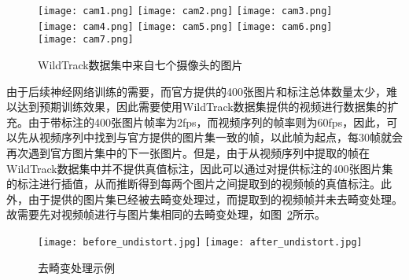 \begin{figure}
    \centering
    \subcaptionbox{\label{cam1}}
      {\texttt{[image: cam1.png]}}
    \subcaptionbox{\label{cam2}}
      {\texttt{[image: cam2.png]}}
    \subcaptionbox{\label{cam3}}
      {\texttt{[image: cam3.png]}}
    \quad
    \subcaptionbox{\label{cam4}}
      {\texttt{[image: cam4.png]}}
    \subcaptionbox{\label{cam5}}
      {\texttt{[image: cam5.png]}}
    \subcaptionbox{\label{cam6}}
      {\texttt{[image: cam6.png]}}
    \subcaptionbox{\label{cam7}}
      {\texttt{[image: cam7.png]}}
    \caption{WildTrack数据集中来自七个摄像头的图片}
    \label{WildTrack_Cam}
\end{figure}

由于后续神经网络训练的需要，而官方提供的400张图片和标注总体数量太少，难以达到预期训练效果，因此需要使用WildTrack数据集提供的视频进行数据集的扩充。由于带标注的400张图片帧率为2fps，而视频序列的帧率则为60fps，因此，可以先从视频序列中找到与官方提供的图片集一致的帧，以此帧为起点，每30帧就会再次遇到官方图片集中的下一张图片。但是，由于从视频序列中提取的帧在WildTrack数据集中并不提供真值标注，因此可以通过对提供标注的400张图片集的标注进行插值，从而推断得到每两个图片之间提取到的视频帧的真值标注。此外，由于提供的图片集已经被去畸变处理过，而提取到的视频帧并未去畸变处理。故需要先对视频帧进行与图片集相同的去畸变处理，如图~\ref{undistortion}所示。

\begin{figure}
  \centering
  \subcaptionbox{\label{before}}
    {\texttt{[image: before\_undistort.jpg]}}
  \subcaptionbox{\label{after}}
    {\texttt{[image: after\_undistort.jpg]}}
  \caption{去畸变处理示例}
  \label{undistortion}
\end{figure}

